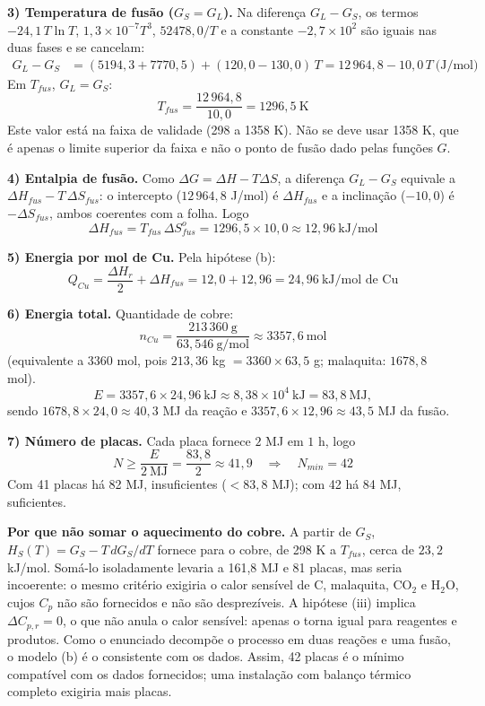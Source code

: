 \documentclass{article}%
\begin{document}
\textbf{3) Temperatura de fusão ($G_S=G_L$).} Na diferença $G_L-G_S$, os termos $-24{,}1\,T\ln T$, $1{,}3\times10^{-7}T^3$, $52478{,}0/T$ e a constante $-2{,}7\times10^{2}$ são iguais nas duas fases e se cancelam:
\begin{align*}
G_L-G_S&=(5194{,}3+7770{,}5)+(120{,}0-130{,}0)\,T=12\,964{,}8-10{,}0\,T\ \text{(J/mol)}
\end{align*}
Em $T_{fus}$, $G_L=G_S$:
\[
T_{fus}=\frac{12\,964{,}8}{10{,}0}=1296{,}5\ \text{K}
\]
Este valor está na faixa de validade (298 a 1358 K). Não se deve usar 1358 K, que é apenas o limite superior da faixa e não o ponto de fusão dado pelas funções $G$.

\textbf{4) Entalpia de fusão.} Como $\Delta G=\Delta H-T\Delta S$, a diferença $G_L-G_S$ equivale a $\Delta H_{fus}-T\,\Delta S_{fus}$: o intercepto ($12\,964{,}8$ J/mol) é $\Delta H_{fus}$ e a inclinação ($-10{,}0$) é $-\Delta S_{fus}$, ambos coerentes com a folha. Logo
\[
\Delta H_{fus}=T_{fus}\,\Delta S^o_{fus}=1296{,}5\times10{,}0\approx 12{,}96\ \text{kJ/mol}
\]

\textbf{5) Energia por mol de Cu.} Pela hipótese (b):
\[
Q_{Cu}=\frac{\Delta H_r}{2}+\Delta H_{fus}=12{,}0+12{,}96=24{,}96\ \text{kJ/mol de Cu}
\]

\textbf{6) Energia total.} Quantidade de cobre:
\[
n_{Cu}=\frac{213\,360\ \text{g}}{63{,}546\ \text{g/mol}}\approx 3357{,}6\ \text{mol}
\]
(equivalente a $3360$ mol, pois $213{,}36$ kg $=3360\times63{,}5$ g; malaquita: $1678{,}8$ mol).
\[
E=3357{,}6\times24{,}96\ \text{kJ}\approx 8{,}38\times10^{4}\ \text{kJ}=83{,}8\ \text{MJ},
\]
sendo $1678{,}8\times24{,}0\approx40{,}3$ MJ da reação e $3357{,}6\times12{,}96\approx43{,}5$ MJ da fusão.

\textbf{7) Número de placas.} Cada placa fornece $2$ MJ em $1$ h, logo
\[
N\ge\frac{E}{2\ \text{MJ}}=\frac{83{,}8}{2}\approx 41{,}9\quad\Rightarrow\quad N_{min}=42
\]
Com 41 placas há 82 MJ, insuficientes ($<83{,}8$ MJ); com 42 há 84 MJ, suficientes.

\textbf{Por que não somar o aquecimento do cobre.} A partir de $G_S$, $H_S(T)=G_S-T\,dG_S/dT$ fornece para o cobre, de 298 K a $T_{fus}$, cerca de $23{,}2$ kJ/mol. Somá-lo isoladamente levaria a 161,8 MJ e 81 placas, mas seria incoerente: o mesmo critério exigiria o calor sensível de C, malaquita, CO$_2$ e H$_2$O, cujos $C_p$ não são fornecidos e não são desprezíveis. A hipótese (iii) implica $\Delta C_{p,r}=0$, o que não anula o calor sensível: apenas o torna igual para reagentes e produtos. Como o enunciado decompõe o processo em duas reações e uma fusão, o modelo (b) é o consistente com os dados. Assim, 42 placas é o mínimo compatível com os dados fornecidos; uma instalação com balanço térmico completo exigiria mais placas.
\end{document}
